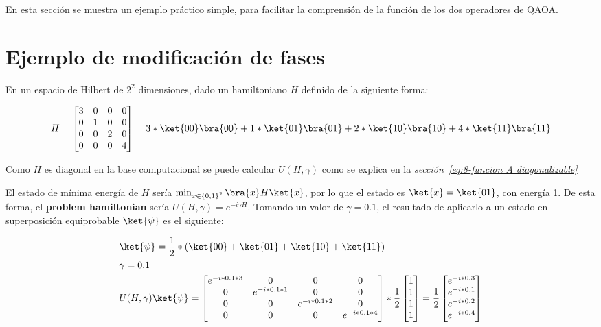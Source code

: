 En esta sección se muestra un ejemplo práctico simple, para facilitar la comprensión de la función de los dos operadores de QAOA\@.

\section{Ejemplo de modificación de fases\label{sec:8-ejemplo de modificacion de fases}}

En un espacio de Hilbert de $2^2$ dimensiones, dado un hamiltoniano $H$ definido de la siguiente forma:

\begin{align*}
  H = \begin{bmatrix}
    3 & 0 & 0 & 0 \\
    0 & 1 & 0 & 0 \\
    0 & 0 & 2 & 0 \\
    0 & 0 & 0 & 4
  \end{bmatrix} = 3*\ket{00}\bra{00} + 1*\ket{01}\bra{01} + 2*\ket{10}\bra{10} + 4*\ket{11}\bra{11}
\end{align*}

Como $H$ es diagonal en la base computacional se puede calcular $U(H, \gamma)$ como se explica en la \textit{sección~\ref{eq:8-funcion A diagonalizable}}

El estado de mínima energía de $H$ sería $\min_{x \in {\{0, 1\}}^2}{\bra{x}H\ket{x}}$, por lo que el estado es $\ket{x} = \ket{01}$, con energía 1.
De esta forma, el \textbf{problem hamiltonian} sería $U(H, \gamma) = e^{-i \gamma H}$. Tomando un valor de $\gamma = 0.1$, el resultado de aplicarlo a un estado en superposición equiprobable $\ket{\psi}$ es el siguiente:

\begin{align*}
  &\ket{\psi} = \frac{1}{2}*(\ket{00} + \ket{01} + \ket{10} + \ket{11}) \\
  &\gamma = 0.1 \\
  &U(H, \gamma) \ket{\psi} =
    \begin{bmatrix}
      e^{-i * 0.1 * 3} & 0                & 0                & 0 \\
      0                & e^{-i * 0.1 * 1} & 0                & 0 \\
      0                & 0                & e^{-i * 0.1 * 2} & 0 \\
      0                & 0                & 0                & e^{-i * 0.1 * 4}
    \end{bmatrix}
    *\frac{1}{2}
    \begin{bmatrix}
      1 \\
      1 \\
      1 \\
      1
    \end{bmatrix} = \frac{1}{2}
    \begin{bmatrix}
      e^{-i * 0.3} \\
      e^{-i * 0.1} \\
      e^{-i * 0.2} \\
      e^{-i * 0.4}
    \end{bmatrix}
\end{align*}


